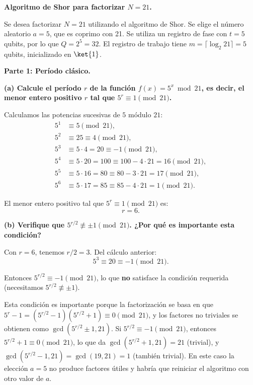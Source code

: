 {\bfseries Algoritmo de Shor para factorizar $N=21$.

Se desea factorizar $N=21$ utilizando el algoritmo de Shor. Se elige el número aleatorio $a=5$, que es coprimo con 21. Se utiliza un registro de fase con $t=5$ qubits, por lo que $Q = 2^5 = 32$. El registro de trabajo tiene $m = \lceil \log_2 21 \rceil = 5$ qubits, inicializado en $\ket{1}$.}

{\bfseries Parte 1: Período clásico.}

{\bfseries (a) Calcule el período $r$ de la función $f(x) = 5^x \bmod 21$, es decir, el menor entero positivo $r$ tal que $5^r \equiv 1 \pmod{21}$.}

Calculamos las potencias sucesivas de $5$ módulo $21$:
\begin{align*}
    5^1 & \equiv 5 \pmod{21},                                             \\
    5^2 & \equiv 25 \equiv 4 \pmod{21},                                   \\
    5^3 & \equiv 5 \cdot 4 = 20 \equiv -1 \pmod{21},                      \\
    5^4 & \equiv 5 \cdot 20 = 100 \equiv 100 - 4 \cdot 21 = 16 \pmod{21}, \\
    5^5 & \equiv 5 \cdot 16 = 80 \equiv 80 - 3 \cdot 21 = 17 \pmod{21},   \\
    5^6 & \equiv 5 \cdot 17 = 85 \equiv 85 - 4 \cdot 21 = 1 \pmod{21}.
\end{align*}

El menor entero positivo tal que $5^r \equiv 1 \pmod{21}$ es:
$$
    \boxed{r = 6.}
$$

\vspace{0.5cm}

{\bfseries (b) Verifique que $5^{r/2} \not\equiv \pm 1 \pmod{21}$. ¿Por qué es importante esta condición?}

Con $r = 6$, tenemos $r/2 = 3$. Del cálculo anterior:
$$
    5^3 \equiv 20 \equiv -1 \pmod{21}.
$$

Entonces $5^{r/2} \equiv -1 \pmod{21}$, lo que \textbf{no} satisface la condición requerida (necesitamos $5^{r/2} \not\equiv \pm 1$).

Esta condición es importante porque la factorización se basa en que $5^r - 1 = (5^{r/2}-1)(5^{r/2}+1) \equiv 0 \pmod{21}$, y los factores no triviales se obtienen como $\gcd(5^{r/2} \pm 1, 21)$. Si $5^{r/2} \equiv -1 \pmod{21}$, entonces $5^{r/2}+1 \equiv 0 \pmod{21}$, lo que da $\gcd(5^{r/2}+1, 21) = 21$ (trivial), y $\gcd(5^{r/2}-1, 21) = \gcd(19, 21) = 1$ (también trivial). En este caso la elección $a=5$ no produce factores útiles y habría que reiniciar el algoritmo con otro valor de $a$.

